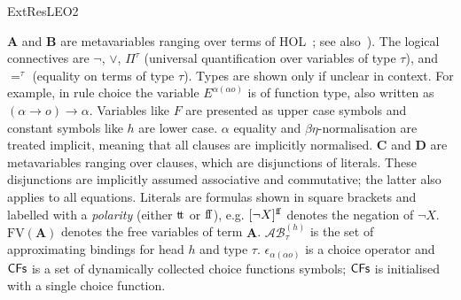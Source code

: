 \begin{entry}{ExtResLEO2}



\begin{clarifications} 
$\mathbf{A}$ and $\mathbf{B}$ are metavariables ranging over terms of
HOL~\cite{sep-type-theory-church}; see also~). The logical
connectives are $\neg$, $\vee$, $\Pi^\tau$ (universal quantification over
variables of type $\tau$), and $=^\tau$ (equality on terms of type $\tau$).
Types are shown only if unclear in context. For example, in  rule choice the
variable $E^{\alpha (\alpha o)}$ is of function type, also written as ${(\alpha
\rightarrow o) \rightarrow \alpha}$. Variables like $F$ are presented as upper
case symbols and constant symbols like $h$  are lower case. $\alpha$ equality
and $\beta\eta$-normalisation are treated implicit, meaning that all clauses are
implicitly normalised. $\mathbf{C}$ and $\mathbf{D}$ are metavariables ranging
over clauses, which are disjunctions of literals. These disjunctions are
implicitly assumed associative and commutative; the latter also applies to all
equations. Literals are formulas shown in square brackets and labelled with a
\emph{polarity} (either ${\mathrm{t}\!\mathrm{t}}$ or ${\mathrm{f}\!\mathrm{f}}$), e.g. $[\neg X]^{\mathrm{f}\!\mathrm{f}}$ denotes
the negation of $\neg X$.  $\mathrm{FV}(\mathbf{A})$ denotes the free variables
of term $\mathbf{A}$. $\mathcal{AB}^{(h)}_\tau$ is the set of approximating
bindings for head $h$ and type $\tau$. $\epsilon_{\alpha (\alpha o)}$ is a
choice operator and $\textsf{CFs}$ is a set of dynamically collected choice
functions symbols; $\textsf{CFs}$ is initialised with a single choice function.
\end{clarifications}



\end{entry}
